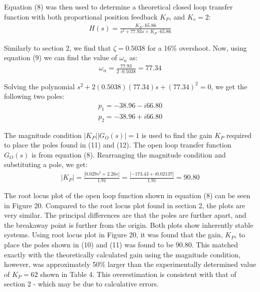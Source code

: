 \documentclass{article}
\begin{document}
Equation (8) was then used to determine a theoretical closed loop transfer function with both proportional position feedback $K_P$, and $K_v = 2$:
\begin{align}
	H(s) = \frac{K_P \cdot 65.86}{s^2 + 77.93s + K_P \cdot 65.86}
\end{align}

Similarly to section 2, we find that $\zeta = 0.5038$ for a 16\% overshoot. Now, using equation (9) we can find the value of $\omega_n$ as:
\begin{align*}
	\omega_n = \frac{77.93}{2 \cdot 0.5038} = 77.34
\end{align*}

Solving the polynomial $s^2 + 2(0.5038)(77.34)s + (77.34)^2 = 0$, we get the following two poles:
\begin{align}
	p_1 = -38.96 - i66.80\\
	p_2 = -38.96 + i66.80
\end{align}

The magnitude condition $|K_P||G_O(s)| = 1$ is used to find the gain $K_P$ required to place the poles found in (11) and (12). The open loop transfer function $G_O(s)$ is from equation (8). Rearranging the magnitude condition and substituting a pole, we get:
\begin{align*}
	|K_P| = \frac{|0.029s^2 + 2.26s|}{1.91} = \frac{|-173.43 + i0.02137|}{1.91} = 90.80
\end{align*}

The root locus plot of the open loop function shown in equation (8) can be seen in Figure 20. Compared to the root locus plot found in section 2, the plots are very similar. The principal differences are that the poles are further apart, and the breakaway point is further from the origin. Both plots show inherently stable systems. Using root locus plot in Figure 20, it was found that the gain, $K_P$, to place the poles shown in (10) and (11) was found to be 90.80. This matched exactly with the theoretically calculated gain using the magnitude condition, however, was approximately 50\% larger than the experimentally determined value of $K_P = 62$ shown in Table 4. This overestimation is consistent with that of section 2 - which may be due to calculative errors.
\end{document}
